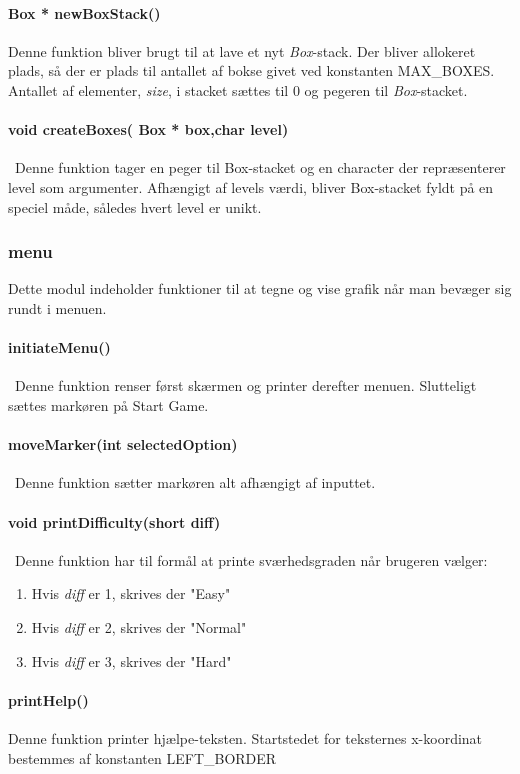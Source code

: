 \paragraph{Box * newBoxStack()}
Denne funktion bliver brugt til at lave et nyt \textit{Box}-stack. Der bliver allokeret plads, så der er plads til antallet af bokse givet ved konstanten MAX\_BOXES. Antallet af elementer, \textit{size}, i stacket sættes til 0 og  pegeren til \textit{Box}-stacket.
\paragraph{
void createBoxes( Box * box,char level)}\
Denne funktion tager en peger til Box-stacket og en character der repræsenterer level som argumenter.  Afhængigt af levels værdi, bliver Box-stacket fyldt på en speciel måde, således hvert level er unikt. 

\subsubsection{menu}
Dette modul indeholder funktioner til at tegne og vise grafik når man bevæger sig rundt i menuen.
\paragraph{initiateMenu()}\
Denne funktion renser først skærmen og printer derefter menuen. Slutteligt sættes markøren på Start Game.
\paragraph{moveMarker(int selectedOption)}\
Denne funktion sætter markøren alt afhængigt af inputtet.
\paragraph{void printDifficulty(short diff)}\
Denne funktion har til formål at printe sværhedsgraden når brugeren vælger:
\begin{enumerate}
\item Hvis \textit{diff} er 1, skrives der "Easy"
\item Hvis \textit{diff} er 2, skrives der "Normal"
\item Hvis \textit{diff} er 3, skrives der "Hard"
\end{enumerate}
\paragraph{printHelp()}
Denne funktion printer hjælpe-teksten. Startstedet for teksternes x-koordinat bestemmes af konstanten LEFT\_BORDER

